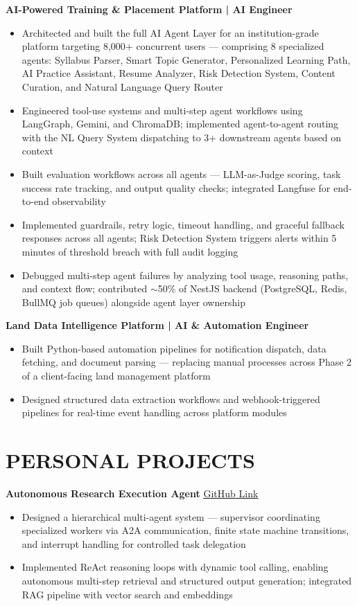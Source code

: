 \documentclass[9.5pt,a4paper]{article}
\begin{document}
\textbf{AI-Powered Training \& Placement Platform | AI Engineer} \hfill \textit{}
\begin{itemize}
\item Architected and built the full AI Agent Layer for an institution-grade platform targeting 8,000+ concurrent users --- comprising 8 specialized agents: Syllabus Parser, Smart Topic Generator, Personalized Learning Path, AI Practice Assistant, Resume Analyzer, Risk Detection System, Content Curation, and Natural Language Query Router
\item Engineered tool-use systems and multi-step agent workflows using LangGraph, Gemini, and ChromaDB; implemented agent-to-agent routing with the NL Query System dispatching to 3+ downstream agents based on context
\item Built evaluation workflows across all agents --- LLM-as-Judge scoring, task success rate tracking, and output quality checks; integrated Langfuse for end-to-end observability
\item Implemented guardrails, retry logic, timeout handling, and graceful fallback responses across all agents; Risk Detection System triggers alerts within 5 minutes of threshold breach with full audit logging
\item Debugged multi-step agent failures by analyzing tool usage, reasoning paths, and context flow; contributed $\sim$50\% of NestJS backend (PostgreSQL, Redis, BullMQ job queues) alongside agent layer ownership
\end{itemize}

\textbf{Land Data Intelligence Platform | AI \& Automation Engineer} \hfill \textit{}
\begin{itemize}
\item Built Python-based automation pipelines for notification dispatch, data fetching, and document parsing --- replacing manual processes across Phase 2 of a client-facing land management platform
\item Designed structured data extraction workflows and webhook-triggered pipelines for real-time event handling across platform modules
\end{itemize}

\section*{PERSONAL PROJECTS}

\textbf{Autonomous Research Execution Agent} \hfill
\href{https://github.com/prabhavjain2004/Autonomous-Research-Execution-Agent}{\underline{GitHub Link}}
\begin{itemize}
\item Designed a hierarchical multi-agent system --- supervisor coordinating specialized workers via A2A communication, finite state machine transitions, and interrupt handling for controlled task delegation
\item Implemented ReAct reasoning loops with dynamic tool calling, enabling autonomous multi-step retrieval and structured output generation; integrated RAG pipeline with vector search and embeddings
\end{itemize}
\end{document}

